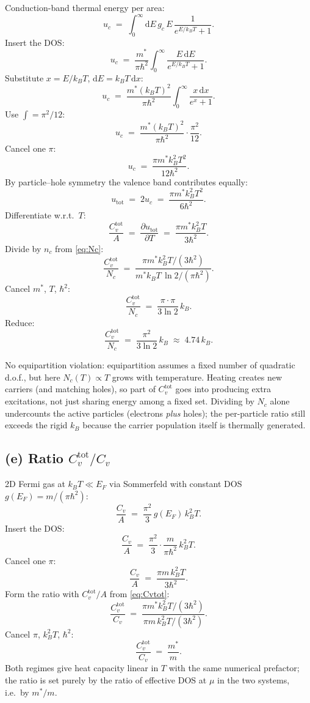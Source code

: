 \documentclass[11pt]{article}
\newcommand{\de}{\mathrm{d}}
\newcommand{\pd}[2]{\frac{\partial #1}{\partial #2}}
\newcommand{\kB}{k_{B}}
\begin{document}
Conduction-band thermal energy per area:
\[
u_c \;=\; \int_0^\infty\!\de E\,g_c\,E\,\frac{1}{e^{E/\kB T}+1}.
\]
Insert the DOS:
\[
u_c \;=\; \frac{m^*}{\pi\hbar^2}\int_0^\infty\!\frac{E\,\de E}{e^{E/\kB T}+1}.
\]
Substitute $x=E/\kB T$, $\de E=\kB T\,\de x$:
\[
u_c \;=\; \frac{m^*(\kB T)^2}{\pi\hbar^2}\int_0^\infty\!\frac{x\,\de x}{e^x+1}.
\]
Use $\int=\pi^2/12$:
\[
u_c \;=\; \frac{m^*(\kB T)^2}{\pi\hbar^2}\cdot\frac{\pi^2}{12}.
\]
Cancel one $\pi$:
\[
u_c \;=\; \frac{\pi m^*\kB^2 T^2}{12\hbar^2}.
\]
By particle--hole symmetry the valence band contributes equally:
\[
u_{\text{tot}} \;=\; 2u_c \;=\; \frac{\pi m^*\kB^2 T^2}{6\hbar^2}.
\]
Differentiate w.r.t.\ $T$:
\begin{equation}
\frac{C_v^{\text{tot}}}{A} \;=\; \pd{u_{\text{tot}}}{T} \;=\; \frac{\pi m^*\kB^2 T}{3\hbar^2}.
\label{eq:Cvtot}
\end{equation}
Divide by $n_c$ from \eqref{eq:Nc}:
\[
\frac{C_v^{\text{tot}}}{N_c} \;=\; \frac{\pi m^*\kB^2 T/(3\hbar^2)}{m^*\kB T\,\ln 2/(\pi\hbar^2)}.
\]
Cancel $m^*$, $T$, $\hbar^2$:
\[
\frac{C_v^{\text{tot}}}{N_c} \;=\; \frac{\pi\cdot\pi}{3\ln 2}\,\kB.
\]
Reduce:
\begin{equation}
\boxed{\;\frac{C_v^{\text{tot}}}{N_c} \;=\; \frac{\pi^2}{3\ln 2}\,\kB \;\approx\; 4.74\,\kB.\;}
\label{eq:Cvper}
\end{equation}

No equipartition violation: equipartition assumes a fixed number of quadratic d.o.f., but here $N_c(T)\propto T$ grows with temperature. Heating creates new carriers (and matching holes), so part of $C_v^{\text{tot}}$ goes into producing extra excitations, not just sharing energy among a fixed set. Dividing by $N_c$ alone undercounts the active particles (electrons \emph{plus} holes); the per-particle ratio still exceeds the rigid $k_B$ because the carrier population itself is thermally generated.

\subsection*{(e) Ratio $C_v^{\text{tot}}/C_v$}

2D Fermi gas at $\kB T\ll E_F$ via Sommerfeld with constant DOS $g(E_F)=m/(\pi\hbar^2)$:
\[
\frac{C_v}{A} \;=\; \frac{\pi^2}{3}\,g(E_F)\,\kB^2 T.
\]
Insert the DOS:
\[
\frac{C_v}{A} \;=\; \frac{\pi^2}{3}\cdot\frac{m}{\pi\hbar^2}\,\kB^2 T.
\]
Cancel one $\pi$:
\[
\frac{C_v}{A} \;=\; \frac{\pi m\,\kB^2 T}{3\hbar^2}.
\]
Form the ratio with $C_v^{\text{tot}}/A$ from \eqref{eq:Cvtot}:
\[
\frac{C_v^{\text{tot}}}{C_v} \;=\; \frac{\pi m^*\kB^2 T/(3\hbar^2)}{\pi m\,\kB^2 T/(3\hbar^2)}.
\]
Cancel $\pi$, $\kB^2 T$, $\hbar^2$:
\begin{equation}
\boxed{\;\frac{C_v^{\text{tot}}}{C_v} \;=\; \frac{m^*}{m}.\;}
\label{eq:ratio}
\end{equation}
Both regimes give heat capacity linear in $T$ with the same numerical prefactor; the ratio is set purely by the ratio of effective DOS at $\mu$ in the two systems, i.e.\ by $m^*/m$.
\end{document}
